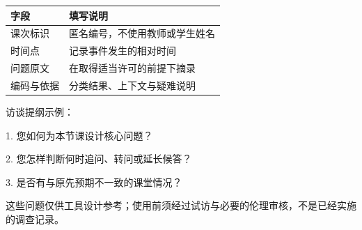\par\medskip
\begin{longtable}{lp{.65\linewidth}}\toprule 字段 & 填写说明\\\midrule\endhead
课次标识 & 匿名编号，不使用教师或学生姓名\\
时间点 & 记录事件发生的相对时间\\
问题原文 & 在取得适当许可的前提下摘录\\
编码与依据 & 分类结果、上下文与疑难说明\\\bottomrule\end{longtable}
\noindent 访谈提纲示例：\par
1. 您如何为本节课设计核心问题？\par
2. 您怎样判断何时追问、转问或延长候答？\par
3. 是否有与原先预期不一致的课堂情况？\par
这些问题仅供工具设计参考；使用前须经过试访与必要的伦理审核，不是已经实施的调查记录。
